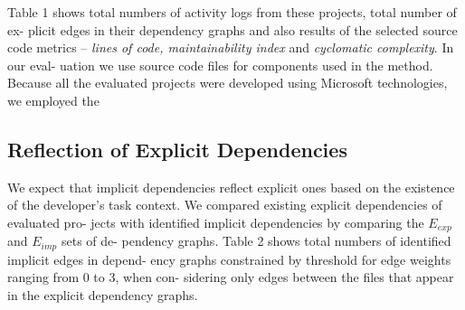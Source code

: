 \documentclass[a4paper]{llncs}
\begin{document}
\noindent
Table 1 shows total numbers of activity logs from these projects, total number of ex- plicit edges in their dependency graphs and also results of the selected source code metrics -- \textit{lines of code, maintainability index} and \textit{cyclomatic complexity}. In our eval- uation we use source code files for components used in the method. Because all the evaluated projects were developed using Microsoft technologies, we employed the %
 
 \subsection{Reflection of Explicit Dependencies}
 We expect that implicit dependencies reflect explicit ones based on the existence of the developer’s task context. We compared existing explicit dependencies of evaluated pro- jects with identified implicit dependencies by comparing the \textit{$E_{exp}$} and \textit{$E_{imp}$} sets of de- pendency graphs. Table 2 shows total numbers of identified implicit edges in depend- ency graphs constrained by threshold for edge weights ranging from 0 to 3, when con- sidering only edges between the files that appear in the explicit dependency graphs.

 
\end{document}
